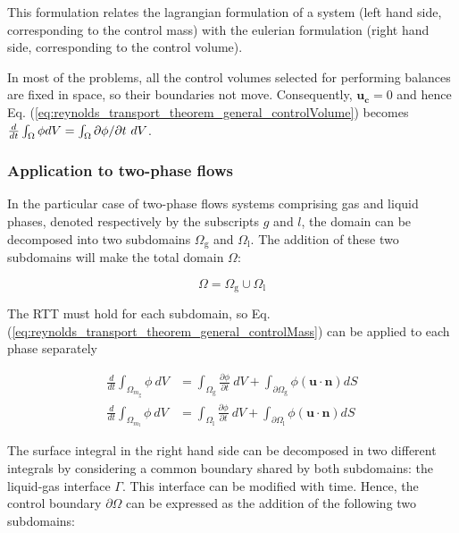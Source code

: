 This formulation relates the lagrangian formulation of a system (left hand side, corresponding to the control mass) with the eulerian formulation (right hand side, corresponding to the control volume). 

In most of the problems, all the control volumes selected for performing balances are fixed in space, so their boundaries not move. Consequently, $\boldsymbol{u_c} = 0$ and hence Eq. (\ref{eq:reynolds_transport_theorem_general_controlVolume}) becomes $\frac{d}{dt} \int_{\scriptsize{\Omega}} \phi dV =  \int_{\scriptsize{\Omega}} \partial \phi/\partial t ~ dV$.

\subsubsection*{Application to two-phase flows}
	\label{subsec:RTT_applied_to_TPS_with_interface}

In the particular case of two-phase flows systems comprising gas and liquid phases, denoted respectively by the subscripts $g$ and $l$, the domain can be decomposed into two subdomains $\Omega_\mathrm{g}$ and $\Omega_\mathrm{l}$. The addition of these two subdomains will make the total domain $\Omega$:

\begin{equation}
\label{eq:omega_domain_partition}
\Omega = \Omega_\mathrm{g} \cup \Omega_\mathrm{l}
\end{equation}

The RTT must hold for each subdomain, so Eq. (\ref{eq:reynolds_transport_theorem_general_controlMass}) can be applied to each phase separately

\begin{subequations}
\begin{align}
\frac{d}{dt} \int_{\Omega_{m_\mathrm{g}}} \phi ~ dV &=  \int_{\Omega_\mathrm{g}} \frac{\partial \phi}{\partial t} ~ dV + \int_{\partial \Omega_\mathrm{g}} \phi \left( \boldsymbol{u} \cdot \boldsymbol{n} \right) dS\\
\frac{d}{dt} \int_{\Omega_{m_\mathrm{l}}} \phi ~ dV &=  \int_{\Omega_\mathrm{l}} \frac{\partial \phi}{\partial t} ~ dV + \int_{\partial \Omega_\mathrm{l}} \phi \left( \boldsymbol{u} \cdot \boldsymbol{n} \right) dS
\end{align}
\end{subequations}

The surface integral in the right hand side can be decomposed in two different integrals by considering a common boundary shared by both subdomains: the liquid-gas interface $\Gamma$. This interface can be modified with time. Hence, the control boundary $\partial \Omega$ can be expressed as the addition of the following two subdomains:

